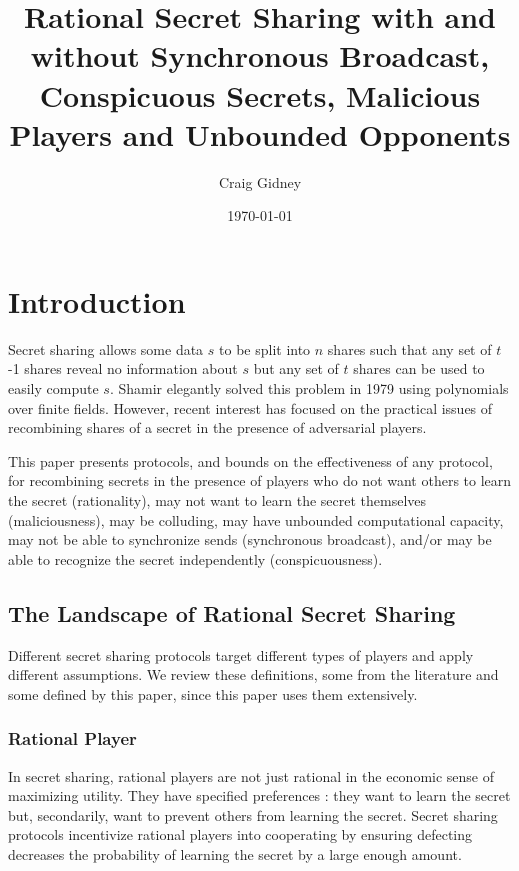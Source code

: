 \documentclass{dalcsthesis}
\title{Rational Secret Sharing with and without Synchronous Broadcast, Conspicuous Secrets, Malicious Players and Unbounded Opponents}
\author{Craig Gidney}
\date{\today}
\begin{document}
\mcs
\maketitle

\chapter{Introduction}

Secret sharing allows some data $s$ to be split into $n$ shares such that any set of $t$-1 shares reveal no information about $s$ but any set of $t$ shares can be used to easily compute $s$. Shamir \cite{shamir79} elegantly solved this problem in 1979 using polynomials over finite fields. However, recent interest \cite{fuch10, ong09, kol08, maleka08, abraham06, gordon06} has focused on the practical issues of recombining shares of a secret in the presence of adversarial players.

This paper presents protocols, and bounds on the effectiveness of any protocol, for recombining secrets in the presence of players who do not want others to learn the secret (rationality), may not want to learn the secret themselves (maliciousness), may be colluding, may have unbounded computational capacity, may not be able to synchronize sends (synchronous broadcast), and/or may be able to recognize the secret independently (conspicuousness).

\section{The Landscape of Rational Secret Sharing}

Different secret sharing protocols target different types of players and apply different assumptions. We review these definitions, some from the literature and some defined by this paper, since this paper uses them extensively.
  
\subsection{Rational Player}

In secret sharing, rational players are not just rational in the economic sense of maximizing utility. They have specified preferences \cite{halpern04}: they want to learn the secret but, secondarily, want to prevent others from learning the secret. Secret sharing protocols incentivize rational players into cooperating by ensuring defecting decreases the probability of learning the secret by a large enough amount.
\end{document}
